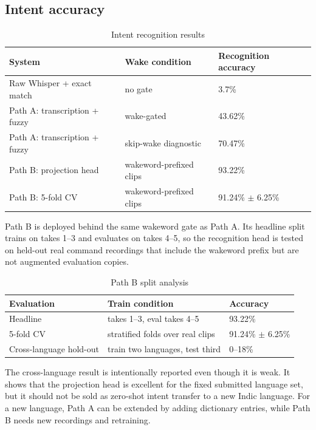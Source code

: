 \documentclass[11pt]{article}
\begin{document}
\subsection{Intent accuracy}

\begin{table}[h]
\centering
\caption{Intent recognition results}
\begin{tabular}{lll}
\toprule
System & Wake condition & Recognition accuracy \\
\midrule
Raw Whisper + exact match & no gate & 3.7\% \\
Path A: transcription + fuzzy & wake-gated & 43.62\% \\
Path A: transcription + fuzzy & skip-wake diagnostic & 70.47\% \\
Path B: projection head & wakeword-prefixed clips & 93.22\% \\
Path B: 5-fold CV & wakeword-prefixed clips & 91.24\% $\pm$ 6.25\% \\
\bottomrule
\end{tabular}
\end{table}

Path B is deployed behind the same wakeword gate as Path A. Its headline split
trains on takes 1--3 and evaluates on takes 4--5, so the recognition head is
tested on held-out real command recordings that include the wakeword prefix
but are not augmented evaluation copies.

\begin{table}[h]
\centering
\caption{Path B split analysis}
\begin{tabular}{lll}
\toprule
Evaluation & Train condition & Accuracy \\
\midrule
Headline & takes 1--3, eval takes 4--5 & 93.22\% \\
5-fold CV & stratified folds over real clips & 91.24\% $\pm$ 6.25\% \\
Cross-language hold-out & train two languages, test third & 0--18\% \\
\bottomrule
\end{tabular}
\end{table}

The cross-language result is intentionally reported even though it is weak.
It shows that the projection head is excellent for the fixed submitted
language set, but it should not be sold as zero-shot intent transfer to a new
Indic language. For a new language, Path A can be extended by adding dictionary
entries, while Path B needs new recordings and retraining.
\end{document}
